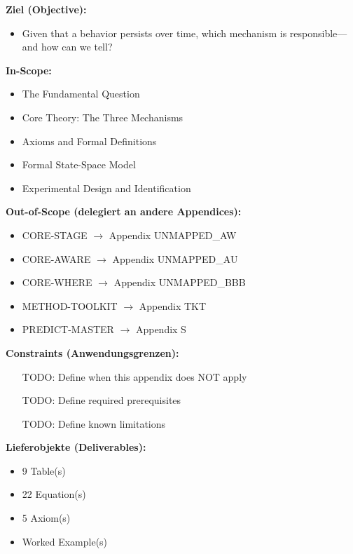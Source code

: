 \begin{tcolorbox}[
    colback=orange!5!white,
    colframe=orange!75!black,
    title={\textbf{Appendix Scope: Ziel / In-Scope / Out-of-Scope / Constraints}},
    fonttitle=\bfseries
]

\textbf{Ziel (Objective):}
\begin{itemize}[nosep]
    \item Given that a behavior persists over time, which mechanism is responsible---and how can we tell?
\end{itemize}

\textbf{In-Scope:}
\begin{itemize}[nosep]
    \item The Fundamental Question
    \item Core Theory: The Three Mechanisms
    \item Axioms and Formal Definitions
    \item Formal State-Space Model
    \item Experimental Design and Identification
\end{itemize}

\textbf{Out-of-Scope (delegiert an andere Appendices):}
\begin{itemize}[nosep]
    \item CORE-STAGE $\rightarrow$ Appendix UNMAPPED_AW
    \item CORE-AWARE $\rightarrow$ Appendix UNMAPPED_AU
    \item CORE-WHERE $\rightarrow$ Appendix UNMAPPED_BBB
    \item METHOD-TOOLKIT $\rightarrow$ Appendix TKT
    \item PREDICT-MASTER $\rightarrow$ Appendix S
\end{itemize}

\textbf{Constraints (Anwendungsgrenzen):}
\begin{itemize}[nosep]
    \item [TODO: Define when this appendix does NOT apply]
    \item [TODO: Define required prerequisites]
    \item [TODO: Define known limitations]
\end{itemize}

\textbf{Lieferobjekte (Deliverables):}
\begin{itemize}[nosep]
    \item 9 Table(s)
    \item 22 Equation(s)
    \item 5 Axiom(s)
    \item Worked Example(s)
\end{itemize}

\end{tcolorbox}




